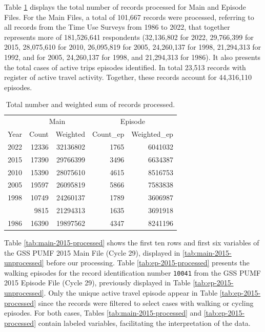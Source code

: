 \documentclass[Royal,times,sageh]{sagej}
\begin{document}
Table \ref{tab:processed-obs} displays the total number of records
processed for Main and Episode Files. For the Main Files, a total of
101,667 records were processed, referring to all records from the Time
Use Surveys from 1986 to 2022, that together represents more of
181,526,641 respondents (32,136,802 for 2022, 29,766,399 for 2015,
28,075,610 for 2010, 26,095,819 for 2005, 24,260,137 for 1998,
21,294,313 for 1992, and for 2005, 24,260,137 for 1998, and 21,294,313
for 1986). It also presents the total cases of active trips episodes
identified. In total 23,513 records with register of active travel
activity. Together, these records account for 44,316,110 episodes.

\begingroup\fontsize{8}{10}\selectfont

\begin{longtable}[t]{rr>{}r|rr}
\caption{\label{tab:table_df_processed}\label{tab:processed-obs}Total number and weighted sum of records processed.}\\
\toprule
\multicolumn{1}{c}{ } & \multicolumn{2}{c}{Main} & \multicolumn{2}{c}{Episode} \\
\cmidrule(l{3pt}r{3pt}){2-3} \cmidrule(l{3pt}r{3pt}){4-5}
Year & Count & Weighted & Count\_ep & Weighted\_ep\\
\midrule
2022 & 12336 & 32136802 & 1765 & 6041032\\
2015 & 17390 & 29766399 & 3496 & 6634387\\
2010 & 15390 & 28075610 & 4615 & 8516753\\
2005 & 19597 & 26095819 & 5866 & 7583838\\
1998 & 10749 & 24260137 & 1789 & 3606987\\
\addlinespace
1992 & 9815 & 21294313 & 1635 & 3691918\\
1986 & 16390 & 19897562 & 4347 & 8241196\\
\bottomrule
\end{longtable}
\endgroup{}

Table \ref{tab:main-2015-processed} shows the first ten rows and first
six variables of the GSS PUMF 2015 Main File (Cycle 29), displayed in
\ref{tab:main-2015-unprocessed} before our processing. Table
\ref{tab:ep-2015-processed} presents the walking episodes for the record
identification number \texttt{10041} from the GSS PUMF 2015 Episode File
(Cycle 29), previously displayed in Table \ref{tab:ep-2015-unprocessed}.
Only the unique active travel episode appear in Table
\ref{tab:ep-2015-processed} since the records were filtered to select
cases with walking or cycling episodes. For both cases, Tables
\ref{tab:main-2015-processed} and \ref{tab:ep-2015-processed} contain
labeled variables, facilitating the interpretation of the data.
\end{document}
